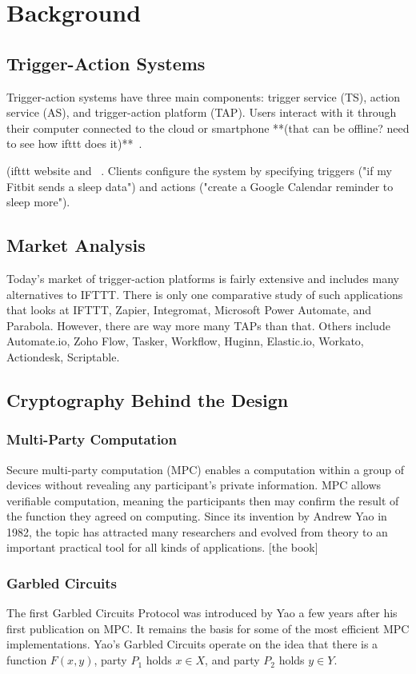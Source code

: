\section{Background}
\label{sec:background}

\subsection{Trigger-Action Systems}

Trigger-action systems have three main components: trigger service (TS), action service (AS), and
trigger-action platform (TAP). Users interact with it through their computer connected to the cloud or
smartphone **(that can be offline? need to see how ifttt does it)**~\cite{DBLP:conf/sp/ChenCWSCF21}.

(ifttt website and ~\cite{DBLP:conf/spChenCWSCF21}. Clients configure the system by specifying triggers ("if my Fitbit sends a sleep data")
and actions ("create a Google Calendar reminder to sleep more"). 

\subsection{Market Analysis}
Today's market of trigger-action platforms is fairly extensive and includes many alternatives to IFTTT.
There is only one comparative study of such applications that looks at IFTTT, Zapier, Integromat,
Microsoft Power Automate, and Parabola. However, there are way more many TAPs than that. Others
include Automate.io, Zoho Flow, Tasker, Workflow, Huginn, Elastic.io, Workato, Actiondesk, Scriptable. 

\subsection{Cryptography Behind the Design}

\subsubsection{Multi-Party Computation}

Secure multi-party computation (MPC) enables a computation within a group of devices without revealing
any participant's private information. MPC allows verifiable computation, meaning the participants then
may confirm the result of the function they agreed on computing. Since its invention by Andrew Yao in
1982, the topic has attracted many researchers and evolved from theory to an important practical tool for
all kinds of applications. [the book]


\subsubsection{Garbled Circuits}

The first Garbled Circuits Protocol was introduced by Yao a few years after his first publication on MPC. It remains the basis for some of the most efficient MPC implementations. Yao's Garbled Circuits operate on the idea that there is a function $F(x,y)$, party $P_1$ holds $x \in X$, and party $P_2$ holds $y \in Y$.